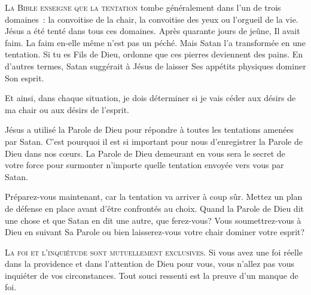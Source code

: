 \lettrine{L}{a Bible enseigne que la tentation}  tombe généralement
 dans l'un de trois domaines~: la convoitise de la chair,
 la convoitise des yeux ou l'orgueil de la vie. Jésus a été tenté
 dans tous ces domaines. Après quarante jours de jeûne, Il avait faim.
 La faim en-elle même n'est pas un péché. Mais Satan l'a transformée
 en une tentation. \og Si tu es Fils de Dieu, ordonne que ces pierres
 deviennent des pains. \fg{} 
 En d'autres termes, Satan suggérait à Jésus de laisser
 Ses appétits physiques dominer Son esprit. 


Et ainsi, dans chaque situation, je dois déterminer si je vais céder
 aux désirs de ma chair ou aux désirs de l'esprit. 

Jésus a utilisé la Parole de Dieu pour répondre à toutes les tentations
 amenées par Satan. C'est pourquoi il est si important pour nous d'enregistrer
 la Parole de Dieu dans nos cœurs. La Parole de Dieu demeurant en vous
 sera le secret de votre force pour surmonter n'importe quelle tentation
 envoyée vers vous par Satan. 

Préparez-vous maintenant, car la tentation va arriver à coup sûr.
 Mettez un plan de défense en place avant d'être confrontés au choix.
 Quand la Parole de Dieu dit une chose et que Satan en dit une autre,
 que ferez-vous? Vous soumettrez-vous à Dieu en suivant Sa Parole
 ou bien laisserez-vous votre chair dominer votre esprit? 

\dvrule







\lettrine{L}{a foi et l'inquiétude sont mutuellement exclusives.}
 Si vous avez une foi réelle dans la providence et dans l'attention
 de Dieu pour vous, vous n'allez pas vous inquiéter de vos circonstances.
 Tout souci ressenti est la preuve d'un manque de foi. 

